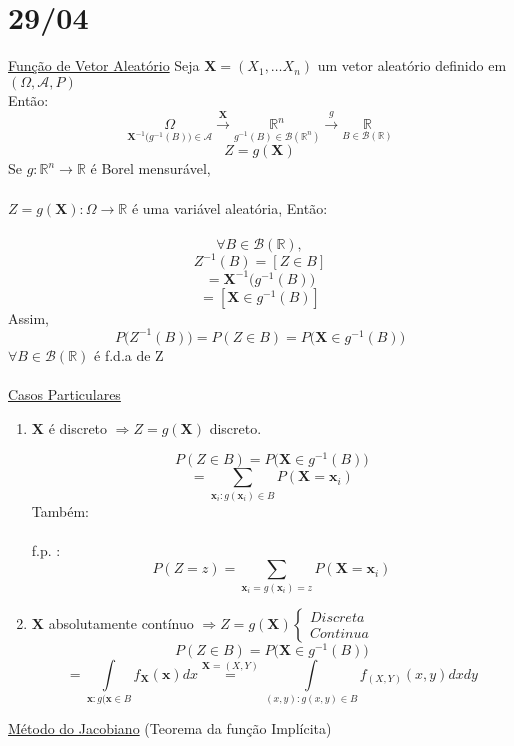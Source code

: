 \documentclass[a4paper,12pt]{article}
\begin{document}
	
	\newpage
	\section{29/04}
	\underline{Função de Vetor Aleatório}
	Seja $\bm X = (X_1,\ldots X_n)$ um vetor aleatório definido em $(\Omega,\mathscr{A},P)$ \\
	Então: 
	$$\underset{\bm X^{-1}\bigg(g^{-1}(B)\bigg)\in \mathscr A }{\Omega} \overset{\bm X}{\longrightarrow}  
	\underset{g^{-1}(B)\in \mathscr{B}(\mathbb{R}^n) }{\mathbb R^n}
	\overset{g}{\longrightarrow} 
	\underset{B \in \mathscr{B}(\mathbb{R}) }{\mathbb R}
	 $$
	$$Z=g(\bm X) $$
	Se $g:\mathbb R^n \rightarrow \mathbb R$ é Borel mensurável,\\
	\\
	$Z=g(\bm X): \Omega\longrightarrow\mathbb R$ é uma variável aleatória, Então:\\
	\\
	$$\forall B \in \mathscr{B}(\mathbb{R}),  $$
	$$Z^{-1}(B)=[Z\in B] $$
$$=\bm X^{-1}\bigg(g^{-1}(B)\bigg) $$
$$=[\bm X \in g^{-1}(B)] $$
Assim, 
$$P\bigg(Z^{-1}(B)\bigg)=P(Z\in B)=P\bigg(\bm X \in g^{-1}(B) \bigg) $$
$\forall B\in \mathscr{B}(\mathbb{R}) $ é f.d.a de Z\\
\\
\underline{Casos Particulares}\\
\begin{enumerate}[label=\arabic*)]
	\item $\bm X$ é discreto $\Rightarrow Z=g(\bm X)$ discreto.
	
	$$P(Z\in B) = P\bigg(\bm X \in g^{-1}(B)\bigg) $$
	$$=\sum\limits_{\bm x_i: g(\bm x_i)\in B} P(\bm X=\bm x_i) $$
	Também:\\
	\\
	f.p. :
	$$P(Z=z)=\sum\limits_{\bm x_i=g(\bm x_i)=z} P(\bm X = \bm x_i) $$
	
	\item $\bm X$ absolutamente contínuo $   \Rightarrow Z= g(\bm X)\begin{cases}
		Discreta\\
		Continua
	\end{cases}$
	$$
	P(Z \in B) = P\bigg(\bm X \in g^{-1}(B)\bigg)	$$
	$$= \int\limits_{\bm x: g(\bm x\in B} f_{\bm X}(\bm x)dx \overset{\bm X =(X,Y)}{=}
	\int\limits_{(x,y):g(x,y)\in B}f_{(X,Y)}(x,y)dxdy
	$$
	

	
\end{enumerate}
	\underline{Método do Jacobiano} (Teorema da função Implícita)\\
\end{document}
